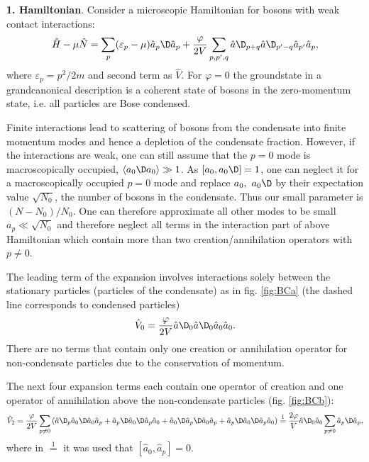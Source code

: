 
\textbf{1. Hamiltonian}. 
Consider a microscopic Hamiltonian for bosons with weak contact interactions:
\begin{equation}
	\hat{H} - \mu \hat{N} = \sum_p (\varepsilon_p - \mu) \hat{a}_p\D \hat{a}_p + \frac{\varphi}{2V} \sum_{p, p', q} \hat{a}\D_{p+q} \hat{a}\D_{p'-q} \hat{a}_{p'} \hat{a}_p,
	\label{BECbase}
\end{equation}
where $\varepsilon_p = p^2 / 2m$ and second term as $\hat{V}$.  For $\varphi = 0$ the groundstate in a grandcanonical description is a coherent
state of bosons in the zero-momentum state, i.e. all particles are Bose condensed. 

Finite interactions lead to scattering of bosons from the condensate into finite momentum modes
and hence a depletion of the condensate fraction. However, if the interactions are weak,
one can still assume that the $p = 0$ mode is macroscopically occupied, $\langle a_0\D a_0\rangle \gg 1$. As $[a_0, a_0\D]=1$, one can neglect it for a macroscopically occupied $p = 0$ mode and replace $a_0,\ a_0\D$ by their expectation value $\sqrt{N_0}$, the number of bosons in the condensate. Thus our small parameter is $(N-N_0)/N_0$. One can therefore approximate all other modes to be small $a_p \ll \sqrt{N_0}$ and  therefore neglect all terms in the interaction part of above Hamiltonian which contain more than two creation/annihilation operators with $p \neq 0$. 



The leading term of the expansion involves interactions solely between the stationary particles (particles of the condensate) as in fig. \ref{fig:BCa} (the dashed line corresponds to condensed particles)
\begin{equation*}
	\hat{V}_0 = \frac{\varphi}{2V} \hat{a}\D_0 \hat{a}\D_0 \hat{a}_0 \hat{a}_0.
\end{equation*}
There are no terms that contain only one creation or annihilation operator for non-condensate particles due to the conservation of momentum.



The next four expansion terms each contain one operator of creation and one operator of annihilation above the non-condensate particles (fig. \ref{fig:BCb}):
\begin{equation*}
	\hat{V}_2 = \frac{\varphi}{2V}  \sum_{p \neq 0} \left(
		\hat{a}\D_p \hat{a}_0\D \hat{a}_0 \hat{a}_p + 
		\hat{a}_p\D \hat{a}_0\D \hat{a}_p \hat{a}_0 + 
		\hat{a}_0\D \hat{a}_p\D \hat{a}_0 \hat{a}_p + 
		\hat{a}_p\D \hat{a}_0\D \hat{a}_p \hat{a}_0
	\right) \overset{1}{=}  \frac{2\varphi}{V} \hat{a}\D_0 \hat{a}_0 \sum_{p \neq 0} \hat{a}_p\D \hat{a}_p,
\end{equation*}
where in $ \overset{1}{=} $ it was used that $[\hat{a}_0, \hat{a}_p] = 0$. 


